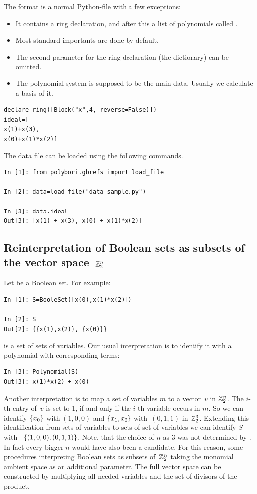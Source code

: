 The format is a normal Python-file with a few exceptions:
\begin{itemize}
    \item It contains a ring declaration, and after this a list of polynomials called .
    \item Most \PolyBoRi standard importants are done by default.
    \item The second parameter for the ring declaration (the  dictionary) can be omitted.
    \item The polynomial system  is supposed to be the main data.
    Usually we calculate a \Groebner basis of it.
\end{itemize}
\begin{lstlisting}
declare_ring([Block("x",4, reverse=False)])
ideal=[
x(1)+x(3),
x(0)+x(1)*x(2)]  
\end{lstlisting}
%
The data file can be loaded using the following commands.
%
\begin{lstlisting}
In [1]: from polybori.gbrefs import load_file

In [2]: data=load_file("data-sample.py")

In [3]: data.ideal
Out[3]: [x(1) + x(3), x(0) + x(1)*x(2)]
\end{lstlisting}

\subsection{Reinterpretation of Boolean sets as subsets of the vector space~$\mathbb{Z}_2^n$}
\label{reinterpretation-of-zdd}
Let  be a Boolean set. For example:
\begin{lstlisting}
In [1]: S=BooleSet([x(0),x(1)*x(2)])

In [2]: S
Out[2]: {{x(1),x(2)}, {x(0)}}
\end{lstlisting}

 is a set of sets of variables.
Our usual interpretation is to identify it with a polynomial with corresponding terms:
\begin{lstlisting}
In [3]: Polynomial(S)
Out[3]: x(1)*x(2) + x(0)
\end{lstlisting}
Another interpretation is to map a set of variables $m$ to a vector~$v$ in $\mathbb{Z}_2^n$.
The $i$-th entry of~$v$ is set to 1, if and only if the $i$-th variable occurs in $m$.
So we can identify $\{x_0\}$ with $(1,0,0)$ and $\{x_1,x_2\}$ with~$(0,1,1)$ in~$\mathbb{Z}_2^3$.
Extending this identification from sets of variables  to sets of set of variables we can identify $S$ with~%
$\{(1,0,0), (0,1,1)\}$.
Note, that the choice of $n$ as $3$ was not determined by . In fact every bigger $n$ would have also been a candidate.
For this reason, some procedures interpreting Boolean sets as subsets of~$\mathbb{Z}_2^n$ taking the monomial ambient space as an additional parameter.
The full vector space can be constructed by multiplying all needed variables and the set of divisors of the product.

